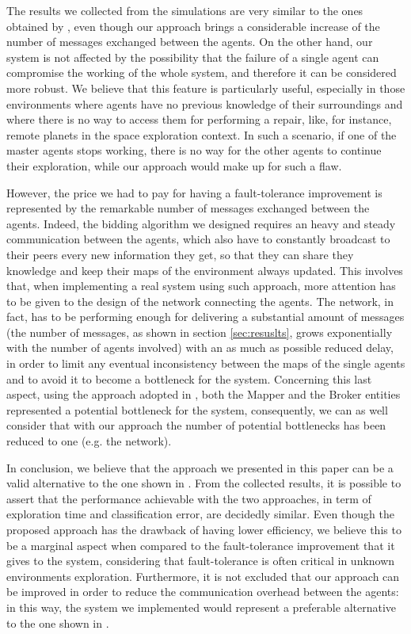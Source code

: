 \documentclass[a4paper, 10pt, conference]{ieeeconf}      %
\begin{document}
The results we collected from the simulations are very similar to the ones obtained by \cite{tavaresgaspar}, even though our approach brings a considerable increase of the number of messages exchanged between the agents. On the other hand, our system is not affected by the possibility that the failure of a single agent can compromise the working of the whole system, and therefore it can be considered more robust. We believe that this feature is particularly useful, especially in those environments where agents have no previous knowledge of their surroundings and where there is no way to access them for performing a repair, like, for instance, remote planets in the space exploration context. In such a scenario, if one of the master agents stops working, there is no way for the other agents to continue their exploration, while our approach would make up for such a flaw. 

However, the price we had to pay for having a fault-tolerance improvement is represented by the remarkable number of messages exchanged between the agents. Indeed, the bidding algorithm we designed requires an heavy and steady communication between the agents, which also have to constantly broadcast to their peers every new information they get, so that they can share they knowledge and keep their maps of the environment always updated. This involves that, when implementing a real system using such approach, more attention has to be given to the design of the network connecting the agents. The network, in fact, has to be performing enough for delivering a substantial amount of messages (the number of messages, as shown in section \ref{sec:resuslts}, grows exponentially with the number of agents involved) with an as much as possible reduced delay, in order to limit any eventual inconsistency between the maps of the single agents and to avoid it to become a bottleneck for the system. Concerning this last aspect, using the approach adopted in \cite{tavaresgaspar}, both the Mapper and the Broker entities represented a potential bottleneck for the system, consequently, we can as well consider that with our approach the number of potential bottlenecks has been reduced to one (e.g. the network). 

In conclusion, we believe that the approach we presented in this paper can be a valid alternative to the one shown in \cite{tavaresgaspar}. From the collected results, it is possible to assert that the performance achievable with the two approaches, in term of exploration time and classification error, are decidedly similar. Even though the proposed approach has the drawback of having lower efficiency, we believe this to be a marginal aspect when compared to the fault-tolerance improvement that it gives to the system, considering that fault-tolerance is often critical in unknown environments exploration. Furthermore, it is not excluded that our approach can be improved in order to reduce the communication overhead between the agents: in this way, the system we implemented would represent a preferable alternative to the one shown in \cite{tavaresgaspar}.
\end{document}
